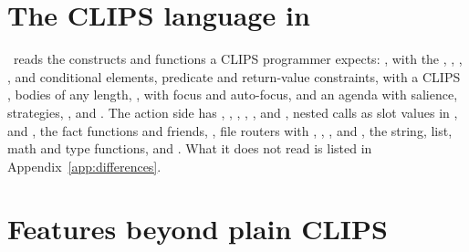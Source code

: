\section{The CLIPS language in \Morendo}

\Morendo\ reads the constructs and functions a CLIPS programmer expects:
,  with the , ,
, ,  and  conditional elements,
predicate and return-value constraints,  with a CLIPS
,  bodies of any length, ,
 with focus and auto-focus, and an agenda with salience,
strategies, ,  and . The action side has
, , , , ,
 and , nested calls as slot values in ,
 and , the fact functions 
and friends, , file routers with , ,
,  and , the string, list, math and
type functions,  and . What it does not read is
listed in Appendix~\ref{app:differences}.

\section{Features beyond plain CLIPS}

